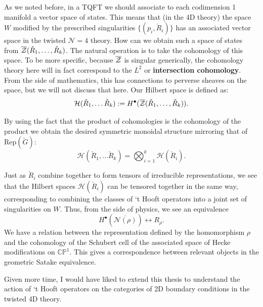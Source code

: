 	As we noted before, in a TQFT we should associate to each codimension 1 manifold a vector space of states. This means that (in the 4D theory) the space $W$ modified by the prescribed singularities $\{(p_i, \check R_i) \}$ has an associated vector space in the twisted $\mathcal N=4$ theory. How can we obtain such a space of states from $\overline{\mathcal{Z}}(\check R_1, \dots, \check R_k)$. The natural operation \cite{witten2010} is to take the cohomology of this space. To be more specific, because $\overline {\mathcal{Z}}$ is singular generically, the cohomology theory here will in fact correspond to the $L^2$ or \textbf{intersection cohomology}. From the side of mathematics, this has connections to perverse sheaves on the space, but we will not discuss that here. Our Hilbert space is defined as:
	\[
		\mathcal H(\check R_1, \dots \check R_k) := H^\bullet (\overline{\mathcal{Z}}(\check R_1, \dots, \check R_k)).
	\]
	
	By using the fact that the product of cohomologies is the cohomology of the product we obtain the desired symmetric monoidal structure mirroring that of $\mathrm{Rep} (\check G)$:
	\begin{equation}
		\mathcal H(\check R_1, \dots \check R_k) = \bigotimes_{i=1}^k \mathcal H(\check R_i).
	\end{equation}
	
	Just as $\check R_i$ combine together to form tensors of irreducible representations, we see that the Hilbert spaces $\mathcal H(\check R_i)$ can be tensored together in the same way, corresponding to combining the classes of `t Hooft operators into a joint set of singularities on $W$. Thus, from the side of physics, we see an equivalence 
	\begin{equation}
		H^\bullet \left(\overline{\mathcal N(\rho)} \right) \leftrightarrow R_\rho.
	\end{equation}
	We have a relation between the representation defined by the homomorphism $\rho$ and the cohomology of the Schubert cell of the associated space of Hecke modifications on $\mathbb{CP}^1$.
	This gives a correspondence between relevant objects in the geometric Satake equivalence. %
	\vspace{0.2in}
	
	\noindent Given more time, I would have liked to extend this thesis to understand the action of `t Hooft operators on the categories of 2D boundary conditions in the twisted 4D theory.
	
